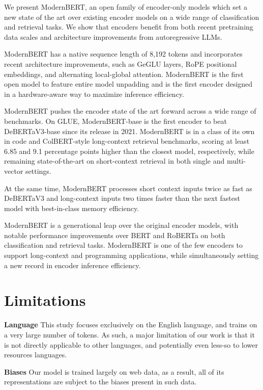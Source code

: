 \documentclass[11pt]{article}
\begin{document}
We present ModernBERT, an open family of encoder-only models which set a new state of the art over existing encoder models on a wide range of classification and retrieval tasks. We show that encoders benefit from both recent pretraining data scales and architecture improvements from autoregressive LLMs.

ModernBERT has a native sequence length of 8,192 tokens and incorporates recent architecture improvements, such as GeGLU layers, RoPE positional embeddings, and alternating local-global attention. ModernBERT is the first open model to feature entire model unpadding and is the first encoder designed in a hardware-aware way to maximize inference efficiency.

ModernBERT pushes the encoder state of the art forward across a wide range of benchmarks. On GLUE, ModernBERT-base is the first encoder to beat DeBERTaV3-base since its release in 2021. ModernBERT is in a class of its own in code and ColBERT-style long-context retrieval benchmarks, scoring at least 6.85 and 9.1 percentage points higher than the closest model, respectively, while remaining state-of-the-art on short-context retrieval in both single and multi-vector settings. 

At the same time, ModernBERT processes short context inputs twice as fast as DeBERTaV3 and long-context inputs two times faster than the next fastest model with best-in-class memory efficiency.

ModernBERT is a generational leap over the original encoder models, with notable performance improvements over BERT and RoBERTa on both classification and retrieval tasks. ModernBERT is one of the few encoders to support long-context and programming applications, while simultaneously setting a new record in encoder inference efficiency.

\section{Limitations}

\textbf{Language} This study focuses exclusively on the English language, and trains on a very large number of tokens. As such, a major limitation of our work is that it is not directly applicable to other languages, and potentially even less-so to lower resources languages.

\textbf{Biases} Our model is trained largely on web data, as a result, all of its representations are subject to the biases present in such data.
\end{document}
